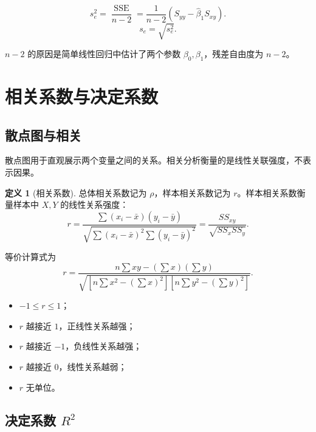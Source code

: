 \documentclass[11pt,a4paper]{article}
\theoremstyle{definition}
\newtheorem{definition}{定义}[section]
\theoremstyle{plain}
\theoremstyle{remark}
\begin{document}
\begin{memorybox}
\[
    \boxed{
    s_e^2=\frac{\operatorname{SSE}}{n-2}
    =
    \frac{1}{n-2}\left(S_{yy}-\hat\beta_1S_{xy}\right).
    }
\]
\[
    \boxed{s_e=\sqrt{s_e^2}.}
\]
\end{memorybox}

$n-2$ 的原因是简单线性回归中估计了两个参数 $\beta_0,\beta_1$，残差自由度为 $n-2$。

\section{相关系数与决定系数}
\label{sec:correlation-r2}

\subsection{散点图与相关}

散点图用于直观展示两个变量之间的关系。相关分析衡量的是线性关联强度，不表示因果。

\begin{definition}[相关系数]
总体相关系数记为 $\rho$，样本相关系数记为 $r$。样本相关系数衡量样本中 $X,Y$ 的线性关系强度：
\[
    r=
    \frac{\sum (x_i-\bar x)(y_i-\bar y)}
    {\sqrt{\sum (x_i-\bar x)^2\sum (y_i-\bar y)^2}}
    =
    \frac{SS_{xy}}{\sqrt{SS_xSS_y}}.
\]
\end{definition}

等价计算式为
\[
    r=
    \frac{
        n\sum xy-(\sum x)(\sum y)
    }
    {
        \sqrt{\left[n\sum x^2-(\sum x)^2\right]
        \left[n\sum y^2-(\sum y)^2\right]}
    }.
\]

\begin{keybox}[相关系数性质]
\begin{itemize}
    \item $-1\le r\le 1$；
    \item $r$ 越接近 $1$，正线性关系越强；
    \item $r$ 越接近 $-1$，负线性关系越强；
    \item $r$ 越接近 $0$，线性关系越弱；
    \item $r$ 无单位。
\end{itemize}
\end{keybox}

\subsection{\texorpdfstring{决定系数 $R^2$}{决定系数 R2}}
\end{document}

